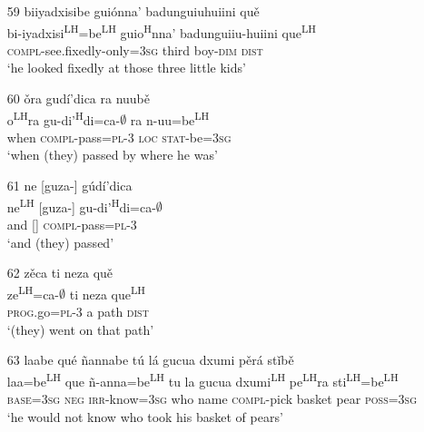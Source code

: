 \begin{itemize}
\item[59]
\glll biiyadxisibe gui\'{o}nna' badunguiuhuiini qu\v{e} \\
bi-iyadxisi\textsuperscript{LH}=be\textsuperscript{LH} guio\textsuperscript{H}nna' badunguiiu-huiini que\textsuperscript{LH} \\
\textsc{compl}-see.fixedly-only=\textsc{3sg} third boy-\textsc{dim} \textsc{dist} \\
\glt `he looked fixedly at those three little kids'


\item[60]
\glll \v{o}ra gud\'{i}'dica ra nuub\v{e} \\
o\textsuperscript{LH}ra gu-di'\textsuperscript{H}di=ca-$\emptyset$ ra n-uu=be\textsuperscript{LH} \\
when \textsc{compl}-pass=\textsc{pl}-\textsc{3} \textsc{loc} \textsc{stat}-be=\textsc{3sg} \\
\glt `when (they) passed by where he was'


\item[61]
\glll ne [guza-] g\'{u}d\'{i}'dica  \\
ne\textsuperscript{LH} [guza-] gu-di'\textsuperscript{H}di=ca-$\emptyset$ \\
and [] \textsc{compl}-pass=\textsc{pl}-\textsc{3} \\
\glt `and (they) passed'
 

\item[62]
\glll z\v{e}ca ti neza qu\v{e} \\
ze\textsuperscript{LH}=ca-$\emptyset$ ti neza que\textsuperscript{LH} \\
\textsc{prog}.go=\textsc{pl}-\textsc{3} a path \textsc{dist} \\
\glt `(they) went on that path'
 

\item[63]
\glll laabe qu\'{e} \~{n}annabe t\'{u} l\'{a} gucua dxumi p\v{e}r\'{a} st\v{i}b\v{e} \\
laa=be\textsuperscript{LH} que \~{n}-anna=be\textsuperscript{LH} tu la gucua dxumi\textsuperscript{LH} pe\textsuperscript{LH}ra sti\textsuperscript{LH}=be\textsuperscript{LH} \\
\textsc{base}=\textsc{3sg} \textsc{neg} \textsc{irr}-know=\textsc{3sg} who name \textsc{compl}-pick basket pear \textsc{poss}=\textsc{3sg} \\
\glt `he would not know who took his basket of pears'

\end{itemize}

